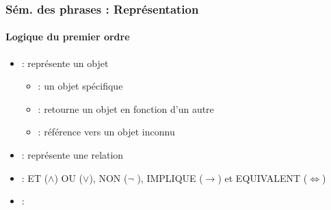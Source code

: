 \documentclass[xcolor=table]{beamer}
\begin{document}
\begin{frame}
	\frametitle{Sém. des phrases : Représentation}
	\framesubtitle{Logique du premier ordre}
	
	\begin{itemize}
		\item {} : représente un objet
		\begin{itemize}
			\item {} : un objet spécifique
			
			\item {} : retourne un objet en fonction d'un autre
			
			\item {} : référence vers un objet inconnu 
			
		\end{itemize}
		\item {} : représente une relation 
		
		
		\item {} : ET ($ \wedge $) OU ($ \vee $), NON ($ \neg $ ), IMPLIQUE ($\rightarrow$) et EQUIVALENT ($ \Leftrightarrow $)
		
		
		\item {} : 
		
		
	\end{itemize}
	
\end{frame}
\end{document}
